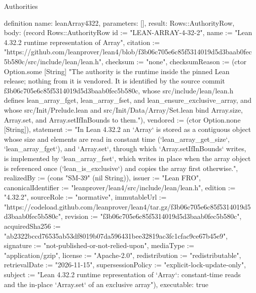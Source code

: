 \begin{lexlean}{Authorities}
\begin{semanticmodule}
definition{
  name: leanArray4322,
  parameters: [],
  result: Rows::AuthorityRow,
  body: (record Rows::AuthorityRow {id := "LEAN-ARRAY-4-32-2", name := "Lean 4.32.2 runtime representation of Array", citation := "https://github.com/leanprover/lean4/blob/f3b06c705e6c85f5314019d5d3baab0fec5b580c/src/include/lean/lean.h", checksum := "none", checksumReason := (ctor Option.some [String] "The authority is the runtime inside the pinned Lean release; nothing from it is vendored. It is identified by the source commit f3b06c705e6c85f5314019d5d3baab0fec5b580c, whose src/include/lean/lean.h defines lean_array_fget, lean_array_fset, and lean_ensure_exclusive_array, and whose src/Init/Prelude.lean and src/Init/Data/Array/Set.lean bind Array.size, Array.set, and Array.setIfInBounds to them."), vendored := (ctor Option.none [String]), statement := "In Lean 4.32.2 an `Array` is stored as a contiguous object whose size and elements are read in constant time (`lean_array_get_size`, `lean_array_fget`), and `Array.set`, through which `Array.setIfInBounds` writes, is implemented by `lean_array_fset`, which writes in place when the array object is referenced once (`lean_is_exclusive`) and copies the array first otherwise.", realizedBy := (cons "SM-39" (nil String)), issuer := "Lean FRO", canonicalIdentifier := "leanprover/lean4/src/include/lean/lean.h", edition := "4.32.2", sourceRole := "normative", immutableUrl := "https://codeload.github.com/leanprover/lean4/tar.gz/f3b06c705e6c85f5314019d5d3baab0fec5b580c", revision := "f3b06c705e6c85f5314019d5d3baab0fec5b580c", acquiredSha256 := "ab2322bccd76535ab53df8019b07da596431bee32819ac3fc1cfac9ce67b45e9", signature := "not-published-or-not-relied-upon", mediaType := "application/gzip", license := "Apache-2.0", redistribution := "redistributable", retrievalDate := "2026-11-15", supersessionPolicy := "explicit-lock-update-only", subject := "Lean 4.32.2 runtime representation of `Array`: constant-time reads and the in-place `Array.set` of an exclusive array"}),
  executable: true
}


\end{semanticmodule}
\end{lexlean}
